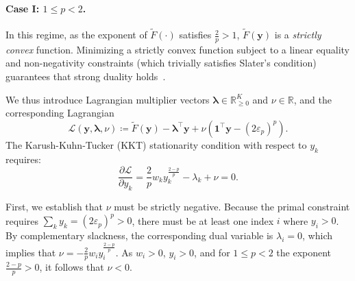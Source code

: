 \documentclass{article}
\def\vy{{\bm{y}}}
\def\gL{{\mathcal{L}}}
\def\sR{{\mathbb{R}}}
\theoremstyle{plain}
\theoremstyle{definition}
\theoremstyle{plain}
\begin{document}
\paragraph{Case I: $1 \leq p < 2$.}
In this regime, as the exponent of $\widetilde{F}(\cdot)$ satisfies $\frac{2}{p} > 1$, $\widetilde{F}(\vy)$ is a \emph{strictly convex} function.
Minimizing a strictly convex function subject to a linear equality and non-negativity constraints (which trivially satisfies Slater's condition) guarantees that strong duality holds~\citep[Section 5.2.3]{boyd-vandenberghe}.

We thus introduce Lagrangian multiplier vectors $\bm\lambda \in \sR^K_{\geq 0}$ and $\nu \in \sR$, and the corresponding Lagrangian
\begin{equation}
    \gL(\vy, \bm\lambda, \nu) \coloneq \tilde{F}(\vy) - \bm\lambda^\top \vy + \nu \left( \mathbf{1}^\top \vy - (2\varepsilon_p)^p \right).
\end{equation}
The Karush-Kuhn-Tucker (KKT) stationarity condition with respect to $y_k$ requires:
\begin{equation}
    \frac{\partial \gL}{\partial y_k} = \frac{2}{p} w_k y_k^{\frac{2-p}{p}} - \lambda_k + \nu = 0.
\end{equation}

First, we establish that $\nu$ must be strictly negative. Because the primal constraint requires $\sum_k y_k = (2\varepsilon_p)^p > 0$, there must be at least one index $i$ where $y_i > 0$.
By complementary slackness, the corresponding dual variable is $\lambda_i = 0$, which implies that $\nu = -\frac{2}{p} w_i y_i^{\frac{2-p}{p}}$.
As $w_i > 0$, $y_i > 0$, and for $1 \leq p < 2$ the exponent $\frac{2-p}{p} > 0$, it follows that $\nu < 0$.
\end{document}
